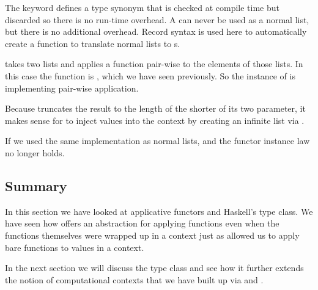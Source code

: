\begin{notelist}
    \item The  keyword defines a type synonym that is checked at compile time but discarded so there is no
          run-time overhead. A  can never be used as a normal list, but there is no additional overhead.
          Record syntax is used here to automatically create a function  to translate normal lists to
          s.
    
    \item {} takes two lists and applies a function pair-wise to the elements of those lists. In this case
          the function is \code{(\$)}, which we have seen previously. So the  instance of 
          is implementing pair-wise application.

    \item Because  truncates the result to the length of the shorter of its two parameter, it makes sense
          for  to inject values into the  context by creating an infinite list via .

    \item If we used the same  implementation as normal lists,  and the functor
          instance law no longer holds.
\end{notelist}

\subsection{Summary}

In this section we have looked at applicative functors and Haskell's  type class. We have seen how
 offers an abstraction for applying functions even when the functions themselves were wrapped up in
a context just as  allowed us to apply bare functions to values in a context.

In the next section we will discuss the  type class and see how it further extends the notion of computational
contexts that we have built up via  and .

